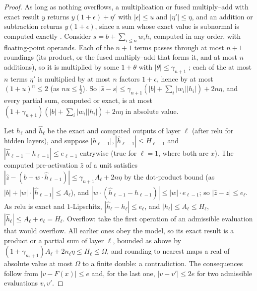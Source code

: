\begin{proof}
As long as nothing overflows, a multiplication or fused multiply--add with exact
result $y$ returns $y(1+\epsilon)+\eta'$ with $|\epsilon|\le u$ and $|\eta'|\le\eta$, and
an addition or subtraction returns $y(1+\epsilon)$, since a sum whose exact value is
subnormal is computed exactly \cite[Chap.~2]{higham2002}.
Consider $s=b+\sum_{i\le n}w_ih_i$ computed in any order, with floating-point operands.
Each of the $n+1$ terms passes through at most $n+1$ roundings (its product, or the
fused multiply--add that forms it, and at most $n$ additions), so it is multiplied by
some $1+\theta$ with $|\theta|\le\gamma_{n+1}$ \cite[Lemma~3.1]{higham2002}; each of the
at most $n$ terms $\eta'$ is multiplied by at most $n$ factors $1+\epsilon$, hence by at
most $(1+u)^n\le2$ (as $nu\le\frac12$). So
$|\hat s-s|\le\gamma_{n+1}(|b|+\sum_i|w_i||h_i|)+2n\eta$, and every partial
sum, computed or exact, is at most $(1+\gamma_{n+1})(|b|+\sum_i|w_i||h_i|)+2n\eta$ in
absolute value.

Let $h_\ell$ and $\hat h_\ell$ be the exact and computed outputs of layer $\ell$ (after
$\mathrm{relu}$ for hidden layers), and suppose $|h_{\ell-1}|,|\hat h_{\ell-1}|\le
H_{\ell-1}$ and $|\hat h_{\ell-1}-h_{\ell-1}|\le e_{\ell-1}$ entrywise (true for
$\ell=1$, where both are $x$). The computed pre-activation $\hat z$ of a unit satisfies
$|\hat z-(b+w\cdot\hat h_{\ell-1})|\le\gamma_{n+1}A_\ell+2n\eta$ by the dot-product bound
(as $|b|+|w|\cdot|\hat h_{\ell-1}|\le A_\ell$), and $|w\cdot(\hat h_{\ell-1}-h_{\ell-1})|\le
|w|\cdot e_{\ell-1}$; so $|\hat z-z|\le e_\ell$. As $\mathrm{relu}$ is exact and
$1$-Lipschitz, $|\hat h_\ell-h_\ell|\le e_\ell$, and $|h_\ell|\le A_\ell\le H_\ell$,
$|\hat h_\ell|\le A_\ell+e_\ell=H_\ell$. Overflow: take the first operation of an
admissible evaluation that would overflow. All earlier ones obey the model, so its exact
result is a product or a partial sum of layer $\ell$, bounded as above by
$(1+\gamma_{n_\ell+1})A_\ell+2n_\ell\eta\le H_\ell\le\Omega$, and rounding to nearest maps
a real of absolute value at most $\Omega$ to a finite double: a contradiction. The
consequences follow from $|v-F(x)|\le e$ and, for the last one, $|v-v'|\le2e$ for two
admissible evaluations $v,v'$.
\end{proof}

